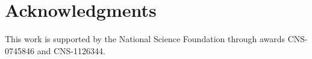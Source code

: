 \vspace{-15pt}
\section{Acknowledgments}\label{sec:acknowlegments}
\vspace{-10pt}
This work is supported by the National Science Foundation through
awards CNS-0745846 and CNS-1126344.